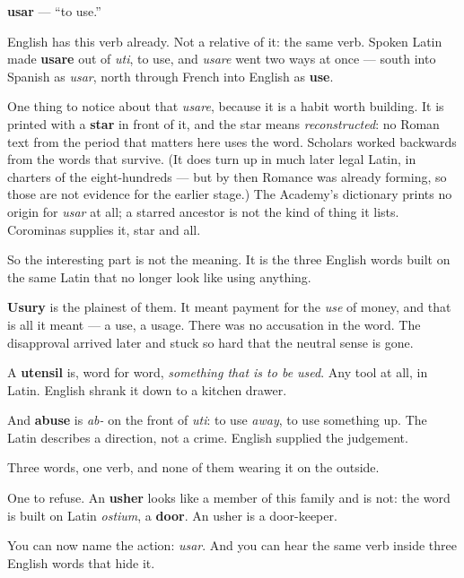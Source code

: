 \begin{cousinweb}
\textbf{usar} — \textquotedblleft{}to use.\textquotedblright{}

English has this verb already. Not a relative of it: the same verb. Spoken Latin made \textbf{usare} out of \emph{uti}, to use, and \emph{usare} went two ways at once — south into Spanish as \emph{usar}, north through French into English as \textbf{use}.

One thing to notice about that \emph{usare}, because it is a habit worth building. It is printed with a \textbf{star} in front of it, and the star means \emph{reconstructed}: no Roman text from the period that matters here uses the word. Scholars worked backwards from the words that survive. (It does turn up in much later legal Latin, in charters of the eight-hundreds — but by then Romance was already forming, so those are not evidence for the earlier stage.) The Academy's dictionary prints no origin for \emph{usar} at all; a starred ancestor is not the kind of thing it lists. Corominas supplies it, star and all.

So the interesting part is not the meaning. It is the three English words built on the same Latin that no longer look like using anything.

\textbf{Usury} is the plainest of them. It meant payment for the \emph{use} of money, and that is all it meant — a use, a usage. There was no accusation in the word. The disapproval arrived later and stuck so hard that the neutral sense is gone.

A \textbf{utensil} is, word for word, \emph{something that is to be used}. Any tool at all, in Latin. English shrank it down to a kitchen drawer.

And \textbf{abuse} is \emph{ab-} on the front of \emph{uti}: to use \emph{away}, to use something up. The Latin describes a direction, not a crime. English supplied the judgement.

Three words, one verb, and none of them wearing it on the outside.

One to refuse. An \textbf{usher} looks like a member of this family and is not: the word is built on Latin \emph{ostium}, a \textbf{door}. An usher is a door-keeper.
\end{cousinweb}

\begin{grammarlens}[title={What you've built}]
You can now name the action: \emph{usar}. And you can hear the same verb inside three English words that hide it.
\end{grammarlens}

